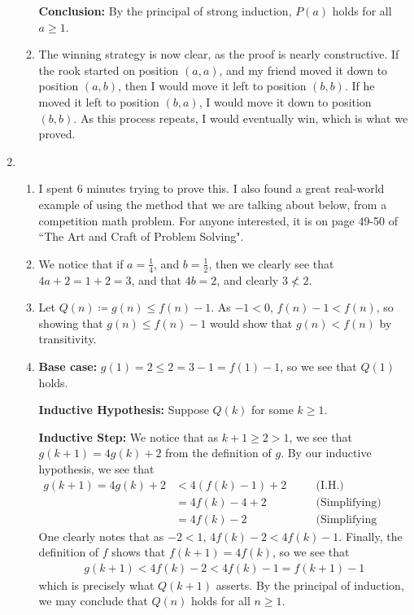 \documentclass[12pt]{article}
\theoremstyle{definition}
\theoremstyle{remark}
\newcommand{\justif}[1]{&\quad &\text{(#1)}}
\begin{document}
\begin{enumerate}[leftmargin=\labelsep]
\begin{enumerate}
			\textbf{Conclusion: } By the principal of strong induction, $P(a)$ holds for all $a \geq 1$.
			
			\item The winning strategy is now clear, as the proof is nearly constructive. If the rook started on position $(a, a)$, and my friend moved it down to position $(a, b)$, then I would move it left to position $(b, b)$. If he moved it left to position $(b, a)$, I would move it down to position $(b, b)$. As this process repeats, I would eventually win, which is what we proved.
		\end{enumerate}
	
		\newpage
		\item 
		\begin{enumerate}
			\item I spent 6 minutes trying to prove this. I also found a great real-world example of using the method that we are talking about below, from a competition math problem. For anyone interested, it is on page 49-50 of ``The Art and Craft of Problem Solving". 
			\item We notice that if $a = \frac14$, and $b = \frac12$, then we clearly see that $4a+2 = 1 + 2 = 3$, and that $4b = 2$, and clearly $3 \not < 2$.
			
			\item Let $Q(n) \coloneqq g(n) \leq f(n) - 1$. As $-1 < 0$, $f(n) - 1 < f(n)$, so showing that $g(n) \leq f(n) - 1$ would show that $g(n) < f(n)$ by transitivity.
			
			\item 
			\textbf{Base case: } $g(1) = 2 \leq 2 = 3 - 1 = f(1) - 1$, so we see that $Q(1)$ holds.
			
			\textbf{Inductive Hypothesis: } Suppose $Q(k)$ for some $k \geq 1$.
			
			\textbf{Inductive Step: } We notice that as $k+1 \geq 2 > 1$, we see that $g(k+1) = 4g(k) + 2$ from the definition of $g$. By our inductive hypothesis, we see that 
			\begin{align*}
				g(k+1) = 4g(k)+2 &< 4(f(k)-1)+2 \justif{I.H.} \\
				&= 4f(k)-4+2 \justif{Simplifying} \\
				&= 4f(k)-2 \justif{Simplifying further}
			\end{align*}
			One clearly notes that as $-2 < 1$, $4f(k)-2 < 4f(k)-1$. Finally, the definition of $f$ shows that $f(k+1)=4f(k)$, so we see that 
			\begin{align*}
				g(k+1) < 4f(k)-2 < 4f(k)-1 = f(k+1)-1
			\end{align*}
			which is precisely what $Q(k+1)$ asserts. By the principal of induction, we may conclude that $Q(n)$ holds for all $n \geq 1$.
		\end{enumerate}
	

\end{enumerate}
\end{document}
